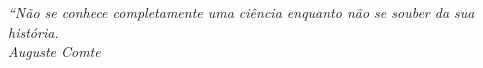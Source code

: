 \begin{epigrafe}
    \vspace*{\fill}
	\begin{flushright}
		\textit{``Não se conhece completamente uma ciência enquanto não se souber da sua história. \\ Auguste Comte}
	\end{flushright}
\end{epigrafe}
